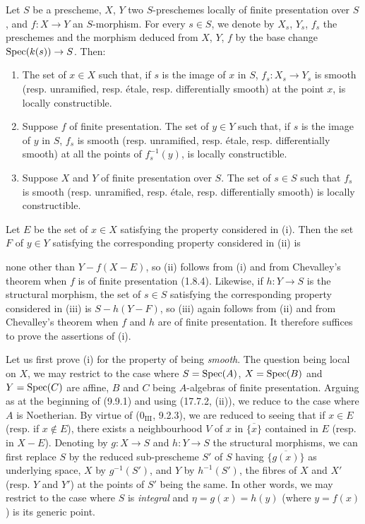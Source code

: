 \begin{proposition}[17.7.11]
\label{IV.17.7.11}
Let $S$ be a prescheme, $X$, $Y$ two $S$-preschemes locally of finite presentation over $S$, and $f:X\to Y$ an $S$-morphism. For every $s\in S$, we denote by $X_s$, $Y_s$, $f_s$ the preschemes and the morphism deduced from $X$, $Y$, $f$ by the base change $\operatorname{Spec}(k(s))\to S$. Then:
\begin{enumerate}
  \item[(i)] The set of $x\in X$ such that, if $s$ is the image of $x$ in $S$, $f_s:X_s\to Y_s$ is smooth (resp. unramified, resp. étale, resp. differentially smooth) at the point $x$, is locally constructible.
  \item[(ii)] Suppose $f$ of finite presentation. The set of $y\in Y$ such that, if $s$ is the image of $y$ in $S$, $f_s$ is smooth (resp. unramified, resp. étale, resp. differentially smooth) at all the points of $f_s^{-1}(y)$, is locally constructible.
  \item[(iii)] Suppose $X$ and $Y$ of finite presentation over $S$. The set of $s\in S$ such that $f_s$ is smooth (resp. unramified, resp. étale, resp. differentially smooth) is locally constructible.
\end{enumerate}
\end{proposition}

Let $E$ be the set of $x\in X$ satisfying the property considered in (i). Then the set $F$ of $y\in Y$ satisfying the corresponding property considered in (ii) is


none other than $Y-f(X-E)$, so (ii) follows from (i) and from Chevalley's theorem when $f$ is of finite presentation (1.8.4). Likewise, if $h:Y\to S$ is the structural morphism, the set of $s\in S$ satisfying the corresponding property considered in (iii) is $S-h(Y-F)$, so (iii) again follows from (ii) and from Chevalley's theorem when $f$ and $h$ are of finite presentation. It therefore suffices to prove the assertions of (i).

Let us first prove (i) for the property of being \emph{smooth}. The question being local on $X$, we may restrict to the case where $S=\operatorname{Spec}(A)$, $X=\operatorname{Spec}(B)$ and $Y=\operatorname{Spec}(C)$ are affine, $B$ and $C$ being $A$-algebras of finite presentation. Arguing as at the beginning of (9.9.1) and using (17.7.2, (ii)), we reduce to the case where $A$ is Noetherian. By virtue of ($0_{\mathrm{III}}$, 9.2.3), we are reduced to seeing that if $x\in E$ (resp. if $x\notin E$), there exists a neighbourhood $V$ of $x$ in $\overline{\{x\}}$ contained in $E$ (resp. in $X-E$). Denoting by $g:X\to S$ and $h:Y\to S$ the structural morphisms, we can first replace $S$ by the reduced sub-prescheme $S'$ of $S$ having $\overline{\{g(x)\}}$ as underlying space, $X$ by $g^{-1}(S')$, and $Y$ by $h^{-1}(S')$, the fibres of $X$ and $X'$ (resp. $Y$ and $Y'$) at the points of $S'$ being the same. In other words, we may restrict to the case where $S$ is \emph{integral} and $\eta=g(x)=h(y)$ (where $y=f(x)$) is its generic point.

